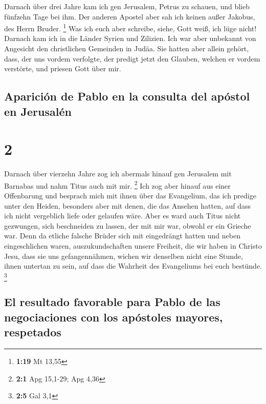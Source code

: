  Darnach über drei Jahre kam ich gen Jerusalem, Petrus zu
schauen, und blieb fünfzehn Tage bei ihm.  Der anderen
Apostel aber sah ich keinen außer Jakobus, des Herrn Bruder. \footnote{\textbf{1:19}
  Mt 13,55}  Was ich euch aber schreibe, siehe, Gott
weiß, ich lüge nicht!  Darnach kam ich in die Länder
Syrien und Zilizien.  Ich war aber unbekannt von
Angesicht den christlichen Gemeinden in Judäa.  Sie
hatten aber allein gehört, dass, der uns vordem verfolgte, der predigt
jetzt den Glauben, welchen er vordem verstörte,  und
priesen Gott über mir.

\hypertarget{apariciuxf3n-de-pablo-en-la-consulta-del-apuxf3stol-en-jerusaluxe9n}{%
\subsection{Aparición de Pablo en la consulta del apóstol en
Jerusalén}\label{apariciuxf3n-de-pablo-en-la-consulta-del-apuxf3stol-en-jerusaluxe9n}}

\hypertarget{section-1}{%
\section{2}\label{section-1}}

 Darnach über vierzehn Jahre zog ich abermals hinauf gen
Jerusalem mit Barnabas und nahm Titus auch mit mir. \footnote{\textbf{2:1}
  Apg 15,1-29; Apg 4,36}  Ich zog aber hinauf aus einer
Offenbarung und besprach mich mit ihnen über das Evangelium, das ich
predige unter den Heiden, besonders aber mit denen, die das Ansehen
hatten, auf dass ich nicht vergeblich liefe oder gelaufen wäre.
 Aber es ward auch Titus nicht gezwungen, sich beschneiden
zu lassen, der mit mir war, obwohl er ein Grieche war. 
Denn da etliche falsche Brüder sich mit eingedrängt hatten und neben
eingeschlichen waren, auszukundschaften unsere Freiheit, die wir haben
in Christo Jesu, dass sie uns gefangennähmen,  wichen wir
denselben nicht eine Stunde, ihnen untertan zu sein, auf dass die
Wahrheit des Evangeliums bei euch bestünde. \footnote{\textbf{2:5} Gal
  3,1}

\hypertarget{el-resultado-favorable-para-pablo-de-las-negociaciones-con-los-apuxf3stoles-mayores-respetados}{%
\subsection{El resultado favorable para Pablo de las negociaciones con
los apóstoles mayores,
respetados}\label{el-resultado-favorable-para-pablo-de-las-negociaciones-con-los-apuxf3stoles-mayores-respetados}}

